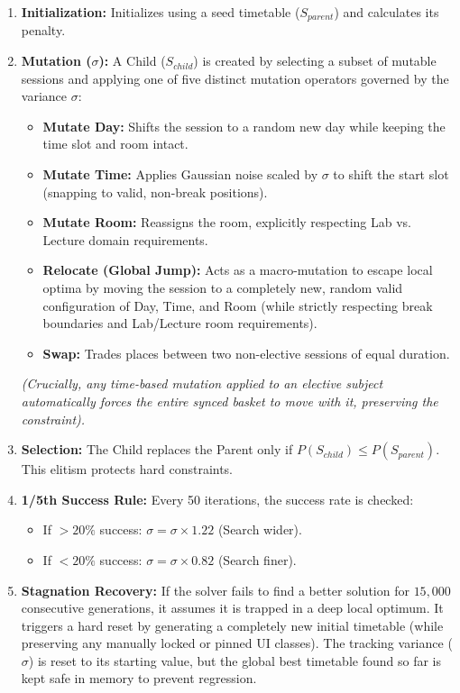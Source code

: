 \documentclass{article}
\begin{document}
\begin{enumerate}
    \item \textbf{Initialization:} Initializes using a seed timetable ($S_{parent}$) and calculates its penalty.
    \item \textbf{Mutation ($\sigma$):} A Child ($S_{child}$) is created by selecting a subset of mutable sessions and applying one of five distinct mutation operators governed by the variance $\sigma$:
    \begin{itemize}
        \item \textbf{Mutate Day:} Shifts the session to a random new day while keeping the time slot and room intact.
        \item \textbf{Mutate Time:} Applies Gaussian noise scaled by $\sigma$ to shift the start slot (snapping to valid, non-break positions).
        \item \textbf{Mutate Room:} Reassigns the room, explicitly respecting Lab vs. Lecture domain requirements.
        \item \textbf{Relocate (Global Jump):} Acts as a macro-mutation to escape local optima by moving the session to a completely new, random valid configuration of Day, Time, and Room (while strictly respecting break boundaries and Lab/Lecture room requirements).
        \item \textbf{Swap:} Trades places between two non-elective sessions of equal duration.
    \end{itemize}
    \textit{(Crucially, any time-based mutation applied to an elective subject automatically forces the entire synced basket to move with it, preserving the constraint).}
    \item \textbf{Selection:} The Child replaces the Parent only if $P(S_{child}) \leq P(S_{parent})$. This elitism protects hard constraints.
    \item \textbf{1/5th Success Rule:} Every 50 iterations, the success rate is checked:
    \begin{itemize}
        \item If $> 20\%$ success: $\sigma = \sigma \times 1.22$ (Search wider).
        \item If $< 20\%$ success: $\sigma = \sigma \times 0.82$ (Search finer).
    \end{itemize}
    \item \textbf{Stagnation Recovery:} If the solver fails to find a better solution for $15,000$ consecutive generations, it assumes it is trapped in a deep local optimum. It triggers a hard reset by generating a completely new initial timetable (while preserving any manually locked or pinned UI classes). The tracking variance ($\sigma$) is reset to its starting value, but the global best timetable found so far is kept safe in memory to prevent regression.
\end{enumerate}
\end{document}

